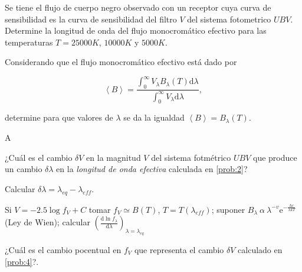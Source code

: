 \documentclass[12pt,a4paper]{practice}
\begin{document}
    \newpage
    \begin{problem}\label{prob:3}
        Se tiene el flujo de cuerpo negro observado con un receptor cuya curva de sensibilidad es la curva de sensibilidad del filtro $V$ del sistema fotometrico $UBV$. Determine la longitud de onda del flujo monocromático efectivo para las temperaturas $T = 25000 K$, $10000 K$ y $5000 K$.

        \begin{recommendation}
            Considerando que el flujo monocromático efectivo está dado por

                $$\left\langle B\right\rangle = \frac{\displaystyle{\int_{0}^{\infty} V_{\lambda} B_{\lambda} \left(T\right) \mathrm{d}\lambda}}{\displaystyle{\int_{0}^{\infty} V_{\lambda} \mathrm{d}\lambda}},$$

            determine para que valores de $\lambda$ se da la igualdad $\left\langle B\right\rangle = B_{\lambda} \left(T\right)$.
        \end{recommendation}

        \begin{solution}
            A
        \end{solution}
    \end{problem}

    \begin{problem}\label{prob:4}
        ¿Cuál es el cambio $\delta V$ en la magnitud $V$ del sistema fotmétrico $UBV$ que produce un cambio $\delta\lambda$ en la \emph{longitud de onda efectiva} calculada en \ref{prob:2}?

        Calcular $\delta\lambda = {\lambda}_{eq} - {\lambda}_{eff}$.

        \begin{recommendation}
            Si $V = -2.5 \log f_V + C$ tomar $f_V \simeq B\left(T\right) $, $T=T\left({\lambda}_{eff}\right)$; suponer $B_{\lambda}\ \alpha\ {\lambda}^{-v} \mathrm{e}^{-\frac{hc}{\lambda k T}}$ (Ley de Wien); calcular $\left(\frac{\mathrm{d} \ln {f}_{\lambda}}{\mathrm{d}\lambda}\right)_{\lambda = {\lambda}_{eq}}$
        \end{recommendation}
    \end{problem}

    \begin{problem}\label{prob:5}
        ¿Cuál es el cambio pocentual en $f_V$ que representa el cambio $\delta V$ calculado en \ref{prob:4}?.
    \end{problem}
\end{document}
